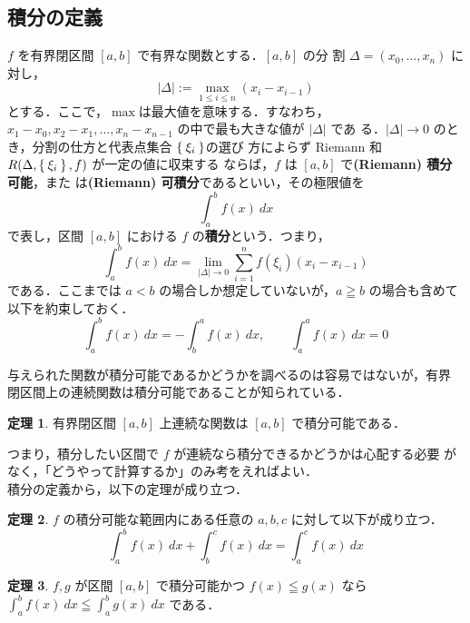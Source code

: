 \documentclass[10pt, uplatex, dvipdfmx]{jsarticle}
\theoremstyle{definition}
\newtheorem{theorem}{定理}[section]
\numberwithin{equation}{section}
\newcommand{\ds}{\displaystyle}
\begin{document}
\newpage


\subsection{積分の定義}

$f$ を有界閉区間 $[a,b]$ で有界な関数とする．$[a,b]$ の分
割 $\Delta =(x_0, \ldots, x_n)$ に対し，
\[
  |\Delta| := \max_{1 \leq i \leq n}(x_i - x_{i-1})
\]
とする．ここで，$\max$は最大値を意味する．すなわち，$x_1-x_0, x_2-x_1,
\ldots, x_{n}-x_{n-1}$ の中で最も大きな値が $|\Delta|$ であ
る．$|\Delta| \to 0$ のとき，分割の仕方と代表点集合 $\Set{\xi_i}$の選び
方によらず Riemann 和 $R(\Delta, \Set{\xi_i}, f)$ が一定の値に収束する
ならば，$f$ は $[a,b]$ で\textbf{(Riemann) 積分可能}，また
は\textbf{(Riemann) 可積分}であるといい，その極限値を
\[
  \int_{a}^{b} f(x) \ dx
\]
で表し，区間 $[a,b]$ における $f$ の\textbf{積分}という．つまり，
\[
  \int_{a}^{b} f(x) \ dx = \lim_{|\Delta| \to 0} \sum_{i=1}^{n} f(\xi_i)(x_i-x_{i-1})
\]
である．ここまでは $a<b$ の場合しか想定していないが，$a \geqq b$ の場合も含めて以下を約束しておく．
\begin{equation}\label{eq:int_promis}
  \int_{a}^{b} f (x) \ dx = - \int_{b}^{a} f(x) \ dx, \qquad \int_{a}^{a} f(x) \ dx =0
\end{equation}


与えられた関数が積分可能であるかどうかを調べるのは容易ではないが，有界
閉区間上の連続関数は積分可能であることが知られている．

\begin{theorem}\label{thm:integrable1}
  有界閉区間 $[a,b]$ 上連続な関数は $[a,b]$ で積分可能である．
\end{theorem}

つまり，積分したい区間で $f$ が連続なら積分できるかどうかは心配する必要
がなく，「どうやって計算するか」のみ考をえればよい．\\

積分の定義から，以下の定理が成り立つ．

\begin{theorem}\label{thm:int_additive}
  $f$ の積分可能な範囲内にある任意の $a,b,c$ に対して以下が成り立つ．
  \[
    \int_{a}^{b} f(x) \ dx + \int_{b}^{c} f(x) \ dx = \int_{a}^{c} f(x) \ dx
  \]
\end{theorem}

\begin{theorem}\label{thm:int_monotomic}
  $f,g$ が区間 $[a,b]$ で積分可能かつ $f(x) \leqq g(x)$ なら $\ds \int_{a}^{b}f(x) \ dx \leqq \int_{a}^{b} g(x) \ dx$ である．
\end{theorem}
\end{document}
